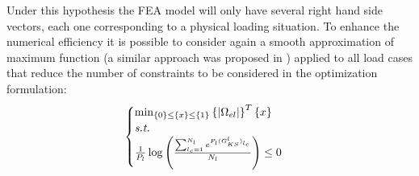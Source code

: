 Under this hypothesis the FEA model will only have several right hand side vectors, each one corresponding to a physical loading situation. To enhance the numerical efficiency it is possible to consider again a smooth approximation of maximum function (a similar approach was proposed in \cite{le2010stress}) applied to all load cases that reduce the number of constraints to be considered in the optimization formulation:
\begin{equation}
\begin{cases}
\min_{\left\lbrace{0}\right \rbrace\leq\left\lbrace{x}\right \rbrace\leq\left\lbrace{1}\right \rbrace} {\left\lbrace{|\Omega_{el}|}\right \rbrace^T\left\lbrace{x}\right \rbrace} \\
\textit{s.t.}\\
\frac{1}{P_l}\log{\left(\frac{\sum_{l_c=1}^{N_l}e^{P_l(G^{l}_{KS})_{l_c}}}{N_l}\right)}\leq 0 \\
\end{cases}
\end{equation}
